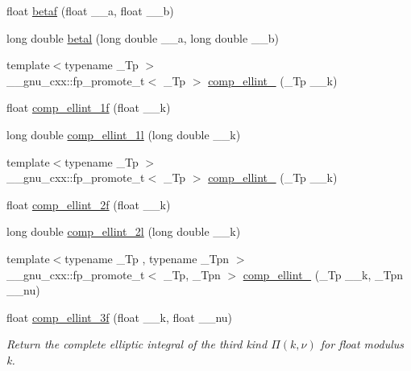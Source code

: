 \begin{DoxyCompactItemize}
\item 
float \hyperlink{group__mathsf__std_ga12dc61ee4c09172151cf092ed387e203}{betaf} (float \+\_\+\+\_\+a, float \+\_\+\+\_\+b)
\item 
long double \hyperlink{group__mathsf__std_ga8caca1cef099f41a88111209c36ce06c}{betal} (long double \+\_\+\+\_\+a, long double \+\_\+\+\_\+b)
\item 
{\footnotesize template$<$typename \+\_\+\+Tp $>$ }\\\+\_\+\+\_\+gnu\+\_\+cxx\+::fp\+\_\+promote\+\_\+t$<$ \+\_\+\+Tp $>$ \hyperlink{group__mathsf__std_gad559217fb01e7a8b7a6e23eeedda64be}{comp\+\_\+ellint\+\_} (\+\_\+\+Tp \+\_\+\+\_\+k)
\item 
float \hyperlink{group__mathsf__std_ga7fb5be999a8125cf7e55e630eb8444a1}{comp\+\_\+ellint\+\_\+1f} (float \+\_\+\+\_\+k)
\item 
long double \hyperlink{group__mathsf__std_ga7247d3dd77c1ff5df3c059fed862dc48}{comp\+\_\+ellint\+\_\+1l} (long double \+\_\+\+\_\+k)
\item 
{\footnotesize template$<$typename \+\_\+\+Tp $>$ }\\\+\_\+\+\_\+gnu\+\_\+cxx\+::fp\+\_\+promote\+\_\+t$<$ \+\_\+\+Tp $>$ \hyperlink{group__mathsf__std_gaadf288465eea84ec609d93de96200aaa}{comp\+\_\+ellint\+\_} (\+\_\+\+Tp \+\_\+\+\_\+k)
\item 
float \hyperlink{group__mathsf__std_ga21700f2f125c42b1f1da1f9c7eea1135}{comp\+\_\+ellint\+\_\+2f} (float \+\_\+\+\_\+k)
\item 
long double \hyperlink{group__mathsf__std_ga47b647ec386c8d4b18a030c97842df18}{comp\+\_\+ellint\+\_\+2l} (long double \+\_\+\+\_\+k)
\item 
{\footnotesize template$<$typename \+\_\+\+Tp , typename \+\_\+\+Tpn $>$ }\\\+\_\+\+\_\+gnu\+\_\+cxx\+::fp\+\_\+promote\+\_\+t$<$ \+\_\+\+Tp, \+\_\+\+Tpn $>$ \hyperlink{group__mathsf__std_ga80419d323d3231870bd588525e818974}{comp\+\_\+ellint\+\_} (\+\_\+\+Tp \+\_\+\+\_\+k, \+\_\+\+Tpn \+\_\+\+\_\+nu)
\item 
float \hyperlink{group__mathsf__std_ga76834d3112f777703330892303267a39}{comp\+\_\+ellint\+\_\+3f} (float \+\_\+\+\_\+k, float \+\_\+\+\_\+nu)
\begin{DoxyCompactList}\small\item\em Return the complete elliptic integral of the third kind $ \Pi(k,\nu) $ for {\ttfamily float} modulus {\ttfamily k}. \end{DoxyCompactList}\item 

\end{DoxyCompactItemize}
